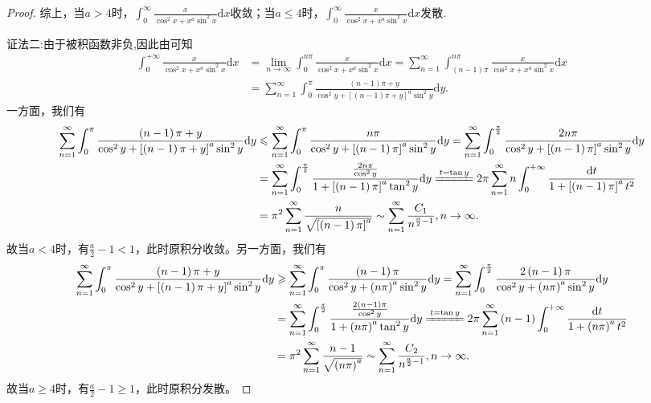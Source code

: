 \documentclass[../../main.tex]{subfiles}%
\begin{document}
\begin{proof}
综上，当$a>4$时，$\int_0^{\infty}\frac{x}{\cos^2x+x^a\sin^2x}\mathrm{d}x$收敛；当$a\leqslant 4$时，$\int_0^{\infty}\frac{x}{\cos^2x+x^a\sin^2x}\mathrm{d}x$发散.

{\color{blue}证法二:}由于被积函数非负,因此由可知
\begin{align*}
\int_0^{+\infty}{\frac{x}{\cos ^2x+x^a\sin ^2x}\mathrm{d}x}&=\underset{n\rightarrow \infty}{\lim}\int_0^{n\pi}{\frac{x}{\cos ^2x+x^a\sin ^2x}\mathrm{d}x}
=\sum_{n=1}^{\infty}{\int_{\left( n-1 \right) \pi}^{n\pi}{\frac{x}{\cos ^2x+x^a\sin ^2x}\mathrm{d}x}}
\\
&=\sum_{n=1}^{\infty}{\int_0^{\pi}{\frac{\left( n-1 \right) \pi +y}{\cos ^2y+\left[ \left( n-1 \right) \pi +y \right] ^a\sin ^2y}\mathrm{d}y}}.
\end{align*}
一方面，我们有
\begin{align*}
\sum_{n=1}^{\infty}{\int_0^{\pi}{\frac{\left( n-1 \right) \pi +y}{\cos ^2y+\left[ \left( n-1 \right) \pi +y \right] ^a\sin ^2y}\mathrm{d}y}}&\leqslant \sum_{n=1}^{\infty}{\int_0^{\pi}{\frac{n\pi}{\cos ^2y+\left[ \left( n-1 \right) \pi \right] ^a\sin ^2y}\mathrm{d}y}} =\sum_{n=1}^{\infty}{\int_0^{\frac{\pi}{2}}{\frac{2n\pi}{\cos ^2y+\left[ \left( n-1 \right) \pi \right] ^a\sin ^2y}\mathrm{d}y}}\\
&=\sum_{n=1}^{\infty}{\int_0^{\frac{\pi}{2}}{\frac{\frac{2n\pi}{\cos ^2y}}{1+\left[ \left( n-1 \right) \pi \right] ^a\tan ^2y}\mathrm{d}y}}
\xlongequal{t=\tan y}2\pi \sum_{n=1}^{\infty}{n\int_0^{+\infty}{\frac{\mathrm{d}t}{1+\left[ \left( n-1 \right) \pi \right] ^at^2}}}\\
&=\pi ^2\sum_{n=1}^{\infty}{\frac{n}{\sqrt{\left[ \left( n-1 \right) \pi \right] ^a}}}\sim \sum_{n=1}^{\infty}{\frac{C_1}{n^{\frac{a}{2}-1}}},n\rightarrow \infty .
\end{align*}
故当$a<4$时，有$\frac{a}{2}-1<1$，此时原积分收敛。另一方面，我们有
\begin{align*}
\sum_{n=1}^{\infty}{\int_0^{\pi}{\frac{\left( n-1 \right) \pi +y}{\cos ^2y+\left[ \left( n-1 \right) \pi +y \right] ^a\sin ^2y}\mathrm{d}y}}&\geqslant \sum_{n=1}^{\infty}{\int_0^{\pi}{\frac{\left( n-1 \right) \pi}{\cos ^2y+\left( n\pi \right) ^a\sin ^2y}\mathrm{d}y}}=\sum_{n=1}^{\infty}{\int_0^{\frac{\pi}{2}}{\frac{2\left( n-1 \right) \pi}{\cos ^2y+\left( n\pi \right) ^a\sin ^2y}\mathrm{d}y}}\\
&=\sum_{n=1}^{\infty}{\int_0^{\frac{\pi}{2}}{\frac{\frac{2\left( n-1 \right) \pi}{\cos ^2y}}{1+\left( n\pi \right) ^a\tan ^2y}\mathrm{d}y}}\xlongequal{t=\tan y}2\pi \sum_{n=1}^{\infty}{\left( n-1 \right) \int_0^{+\infty}{\frac{\mathrm{d}t}{1+\left( n\pi \right) ^at^2}}}\\
&=\pi ^2\sum_{n=1}^{\infty}{\frac{n-1}{\sqrt{\left( n\pi \right) ^a}}}\sim \sum_{n=1}^{\infty}{\frac{C_2}{n^{\frac{a}{2}-1}}},n\rightarrow \infty .
\end{align*}
故当$a\geqslant 4$时，有$\frac{a}{2}-1\geqslant 1$，此时原积分发散。
\end{proof}
\end{document}
